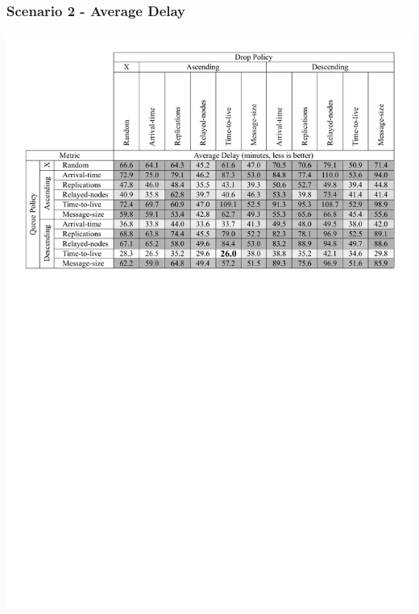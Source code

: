\begin{frame}
  \frametitle{Scenario 2 - Average Delay}
  \begin{center}
   \includegraphics[width=1.0\textwidth]{fig/tables/scenario2_part3.pdf}
  \end{center}
\end{frame}

